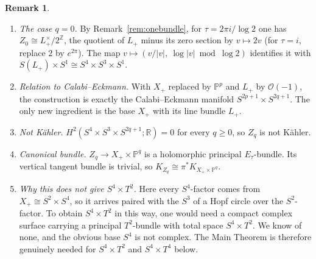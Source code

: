 \documentclass{article}
\DeclareMathOperator{\Z}{\mathbb{Z}}
\theoremstyle{definition}
\newtheorem{remark}[theorem]{Remark}
\theoremstyle{plain}
\newcommand{\R}{\mathbb{R}}
\newcommand{\PP}{\mathbb{P}}
\newcommand{\cO}{\mathcal{O}}
\begin{document}
\begin{remark}\label{rem:Zq}
\begin{enumerate}
\item \emph{The case $q=0$.} By Remark~\ref{rem:onebundle}, for $\tau=2\pi i/\log2$ one has
  $Z_0\cong L_+^\times/2^{\Z}$, the
  quotient of $L_+$ minus its zero section by $v\mapsto2v$ (for $\tau=i$, replace $2$ by
  $e^{2\pi}$). The map
  $v\mapsto(v/|v|,\ \log|v|\bmod\log2)$ identifies it with
  $S(L_+)\times S^1\cong S^4\times S^3\times S^1$.
\item \emph{Relation to Calabi--Eckmann.} With $X_+$ replaced by $\PP^p$ and $L_+$ by
  $\cO(-1)$, the construction is exactly the Calabi--Eckmann manifold
  $S^{2p+1}\times S^{2q+1}$. The only new ingredient is the base $X_+$ with its line bundle
  $L_+$.
\item \emph{Not Kähler.} $H^2(S^4\times S^3\times S^{2q+1};\R)=0$ for every $q\ge0$, so
  $Z_q$ is not Kähler.
\item \emph{Canonical bundle.} $Z_q\to X_+\times\PP^q$ is a holomorphic principal
  $E_\tau$-bundle. Its vertical tangent bundle is trivial, so
  $K_{Z_q}\cong\pi^*K_{X_+\times\PP^q}$.
\item \emph{Why this does not give $S^4\times T^2$.} Here every $S^4$-factor comes from
  $X_+\cong S^2\times S^4$, so it arrives paired with the $S^3$ of a Hopf circle over the
  $S^2$-factor. To obtain $S^4\times T^2$ in this way, one would need a compact complex
  surface carrying a principal $T^2$-bundle with total space $S^4\times T^2$. We know of
  none, and the obvious base $S^4$ is not complex. The Main Theorem is therefore
  genuinely needed for $S^4\times T^2$ and $S^4\times T^4$ below.
\end{enumerate}
\end{remark}
\end{document}
